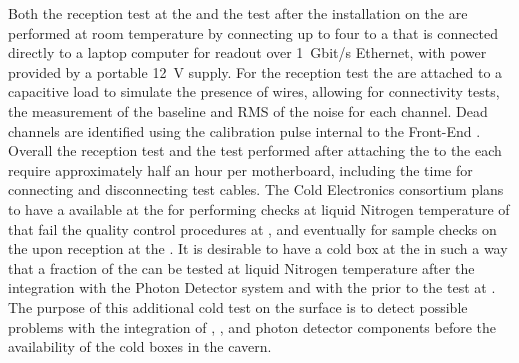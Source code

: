 Both the reception test at the  and the test after the
installation on the  are performed at room temperature 
by connecting up to four  to a  that is 
connected directly to a laptop computer for readout over 1~Gbit/s 
Ethernet, with power provided by a portable 12~V supply. For 
the reception test the  are attached to a capacitive 
load to simulate the presence of wires, allowing for connectivity 
tests, the measurement of the baseline and RMS of the noise for 
each channel. Dead channels are identified using the calibration 
pulse internal to the Front-End . Overall the reception 
test and the test performed after attaching the  to the 
 each require approximately half an hour per motherboard, 
including  the time for connecting and disconnecting test cables.
The Cold Electronics consortium plans to have a  available
at the  for performing checks at liquid Nitrogen temperature
of  that fail the quality control procedures at \surf,
and eventually for sample checks on the  upon reception
at the . It is desirable to have a cold box at the 
in such a way that a fraction of the  can be tested at
liquid Nitrogen temperature after the integration with the Photon
Detector system and with the  prior to the test at 
\surf. The purpose of this additional cold test on the surface is to
detect possible problems with the integration of , ,
and photon detector components before the availability of the cold
boxes in the \surf cavern.

